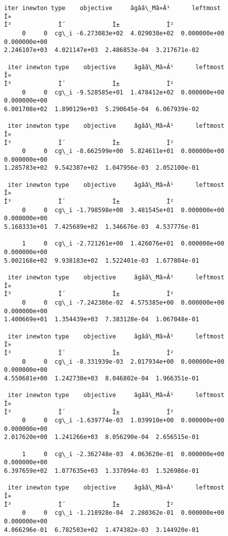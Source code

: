     \begin{Verbatim}[commandchars=\\\{\}]
 iter inewton type    objective     âgââ\_Mâ»Â¹      leftmost         Î»
Î³             Î´             Î±             Î²
     0     0  cg\_i -6.273083e+02  4.029038e+02  0.000000e+00  0.000000e+00
2.246107e+03  4.021147e+03  2.486853e-04  3.217671e-02

 iter inewton type    objective     âgââ\_Mâ»Â¹      leftmost         Î»
Î³             Î´             Î±             Î²
     0     0  cg\_i -9.528585e+01  1.478412e+02  0.000000e+00  0.000000e+00
6.001708e+02  1.890129e+03  5.290645e-04  6.067939e-02

 iter inewton type    objective     âgââ\_Mâ»Â¹      leftmost         Î»
Î³             Î´             Î±             Î²
     0     0  cg\_i -8.662599e+00  5.824611e+01  0.000000e+00  0.000000e+00
1.285783e+02  9.542387e+02  1.047956e-03  2.052100e-01

 iter inewton type    objective     âgââ\_Mâ»Â¹      leftmost         Î»
Î³             Î´             Î±             Î²
     0     0  cg\_i -1.798598e+00  3.481545e+01  0.000000e+00  0.000000e+00
5.168333e+01  7.425689e+02  1.346676e-03  4.537776e-01

     1     0  cg\_i -2.721261e+00  1.426076e+01  0.000000e+00  0.000000e+00
5.002168e+02  9.938183e+02  1.522401e-03  1.677804e-01

 iter inewton type    objective     âgââ\_Mâ»Â¹      leftmost         Î»
Î³             Î´             Î±             Î²
     0     0  cg\_i -7.242386e-02  4.575385e+00  0.000000e+00  0.000000e+00
1.400669e+01  1.354439e+03  7.383128e-04  1.067048e-01

 iter inewton type    objective     âgââ\_Mâ»Â¹      leftmost         Î»
Î³             Î´             Î±             Î²
     0     0  cg\_i -8.331939e-03  2.017934e+00  0.000000e+00  0.000000e+00
4.550681e+00  1.242730e+03  8.046802e-04  1.966351e-01

 iter inewton type    objective     âgââ\_Mâ»Â¹      leftmost         Î»
Î³             Î´             Î±             Î²
     0     0  cg\_i -1.639774e-03  1.039910e+00  0.000000e+00  0.000000e+00
2.017620e+00  1.241266e+03  8.056290e-04  2.656515e-01

     1     0  cg\_i -2.362748e-03  4.063620e-01  0.000000e+00  0.000000e+00
6.397659e+02  1.077635e+03  1.337094e-03  1.526986e-01

 iter inewton type    objective     âgââ\_Mâ»Â¹      leftmost         Î»
Î³             Î´             Î±             Î²
     0     0  cg\_i -1.218928e-04  2.280362e-01  0.000000e+00  0.000000e+00
4.066296e-01  6.782503e+02  1.474382e-03  3.144920e-01


\end{Verbatim}
